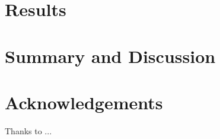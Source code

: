 \documentclass[final,5p,times,twocolumn]{elsarticle}
\newcommand{\kms}{km\,s$^{-1}$}
\begin{document}
%    

%

\section{Results}\label{sec:results}




\section{Summary and Discussion}\label{sec:summary}

\section*{Acknowledgements}
Thanks to ...
\end{document}
